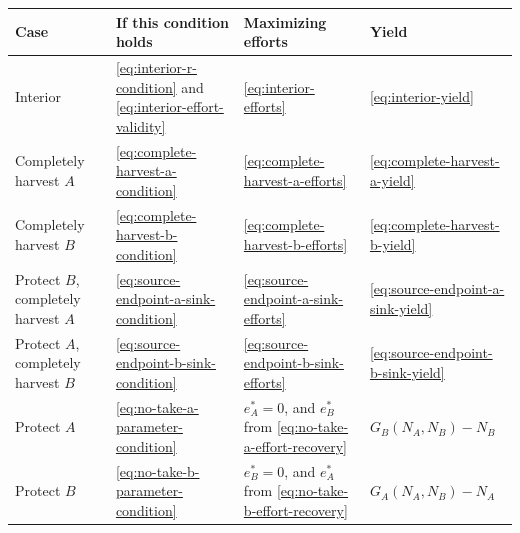 \documentclass{article}
\numberwithin{equation}{section}
\begin{document}
\begin{center}
\small
\setlength{\tabcolsep}{3pt}
\renewcommand{\arraystretch}{1.35}
\begin{tabular}{
    >{\raggedright\arraybackslash}p{}
    >{\raggedright\arraybackslash}p{}
    >{\raggedright\arraybackslash}p{}
    >{\raggedright\arraybackslash}p{}
}
\hline
Case & If this condition holds & Maximizing efforts & Yield \\
\hline
Interior
&
\eqref{eq:interior-r-condition} and
\eqref{eq:interior-effort-validity}
&
\eqref{eq:interior-efforts}
&
\eqref{eq:interior-yield}
\\

Completely harvest $A$
&
\eqref{eq:complete-harvest-a-condition}
&
\eqref{eq:complete-harvest-a-efforts}
&
\eqref{eq:complete-harvest-a-yield}
\\

Completely harvest $B$
&
\eqref{eq:complete-harvest-b-condition}
&
\eqref{eq:complete-harvest-b-efforts}
&
\eqref{eq:complete-harvest-b-yield}
\\

Protect $B$, completely harvest $A$
&
\eqref{eq:source-endpoint-a-sink-condition}
&
\eqref{eq:source-endpoint-a-sink-efforts}
&
\eqref{eq:source-endpoint-a-sink-yield}
\\

Protect $A$, completely harvest $B$
&
\eqref{eq:source-endpoint-b-sink-condition}
&
\eqref{eq:source-endpoint-b-sink-efforts}
&
\eqref{eq:source-endpoint-b-sink-yield}
\\

Protect $A$
&
\eqref{eq:no-take-a-parameter-condition}
&
$e_A^*=0$, and $e_B^*$ from
\eqref{eq:no-take-a-effort-recovery}
&
$G_B(N_A,N_B)-N_B$
\\

Protect $B$
&
\eqref{eq:no-take-b-parameter-condition}
&
$e_B^*=0$, and $e_A^*$ from
\eqref{eq:no-take-b-effort-recovery}
&
$G_A(N_A,N_B)-N_A$
\\
\hline
\end{tabular}
\end{center}
\end{document}
